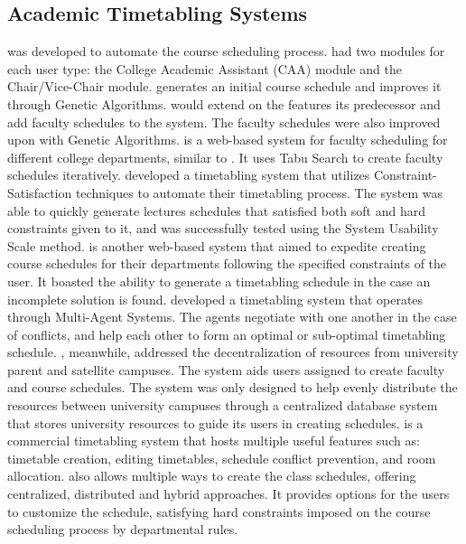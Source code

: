 \subsection{Academic Timetabling Systems}
\cite{Assyst} was developed to automate the course scheduling process. \cite{Assyst} had two modules for each user type: the College Academic Assistant (CAA) module and the Chair/Vice-Chair module. \cite{Assyst} generates an initial course schedule and improves it through Genetic Algorithms. \cite{Assyst2} would extend on the features its predecessor and add faculty schedules to the system. The faculty schedules were also improved upon with Genetic Algorithms. \cite{eAssyst} is a web-based system for faculty scheduling for different college departments, similar to \cite{Assyst2}. It uses Tabu Search to create faculty schedules iteratively. \cite{2013Nigeria} developed a timetabling system that utilizes Constraint-Satisfaction techniques to automate their timetabling process. The system was able to quickly generate lectures schedules that satisfied both soft and hard constraints given to it, and was successfully tested using the System Usability Scale method. \cite{UPM} is another web-based system that aimed to expedite creating course schedules for their departments following the specified constraints of the user. It boasted the ability to generate a timetabling schedule in the case an incomplete solution is found. \cite{Oprea2007} developed a timetabling system that operates through Multi-Agent Systems. The agents negotiate with one another in the case of conflicts, and help each other to form an optimal or sub-optimal timetabling schedule. \cite{bulacanState}, meanwhile, addressed the decentralization of resources from university parent and satellite campuses. The system aids users assigned to create faculty and course schedules. The system was only designed to help evenly distribute the resources between university campuses through a centralized database system that stores university resources to guide its users in creating schedules. \cite{UniTime} is a commercial timetabling system that hosts multiple useful features such as: timetable creation, editing timetables, schedule conflict prevention, and room allocation. \cite{UniTime} also allows multiple ways to create the class schedules, offering centralized, distributed and hybrid approaches. It provides options for the users to customize the schedule, satisfying hard constraints imposed on the course scheduling process by departmental rules.

